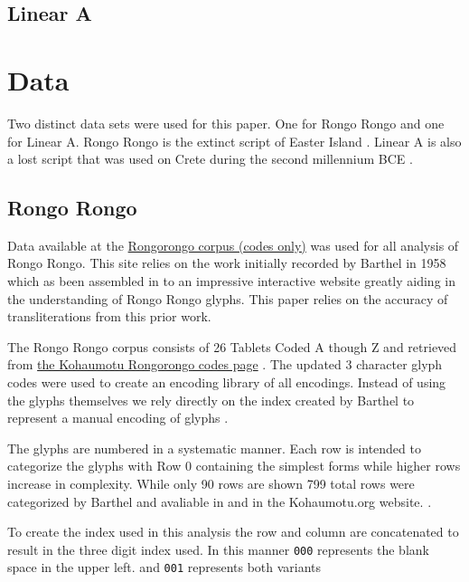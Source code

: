 \documentclass[preprint,12pt]{elsarticle}
\begin{document}
\subsection{Linear A}


\section{Data}
\label{data}
Two distinct data sets were used for this paper. One for Rongo Rongo and one for Linear A. Rongo Rongo is the extinct script of Easter Island \cite{fischer1997rongorongo}. Linear A is also a lost script that was used on Crete during the second millennium BCE \cite{salgarella2021_sigla}.  

\subsection{Rongo Rongo}
Data available at the \href{http://kohaumotu.org/Rongorongo/Glyph_Library/glyph_variants.html}{Rongorongo corpus (codes only)}\cite{spaelti_2012_glyph} was used for all analysis of Rongo Rongo. This site relies on the work initially recorded by Barthel in 1958 \cite{barthel1958grundlagen} which as been assembled in to an impressive interactive website greatly aiding in the understanding of Rongo Rongo glyphs. This paper relies on the accuracy of transliterations from this prior work. 

The Rongo Rongo corpus consists of 26 Tablets Coded A though Z and retrieved from \href{http://kohaumotu.org/Rongorongo_new/views/codes_only.php}{the Kohaumotu Rongorongo codes page} \cite{spaelti_2012_glyph}. The updated 3 character glyph codes were used to create an encoding library of all encodings. Instead of using the glyphs themselves we rely directly on the index created by Barthel to represent a manual encoding of glyphs \cite{barthel1958grundlagen}.

The glyphs are numbered in a systematic manner. Each row is intended to categorize the glyphs with Row 0 containing the simplest forms while higher rows increase in complexity. While only 90 rows are shown 799 total rows were categorized by Barthel and avaliable in \cite{barthel1958grundlagen} and in the Kohaumotu.org website. \cite{spaelti_2012_glyph}.

To create the index used in this analysis the row and column are concatenated to result in the three digit index used.
In this manner \texttt{000} represents the blank space in the upper left. 
and \texttt{001} represents both variants
\end{document}
